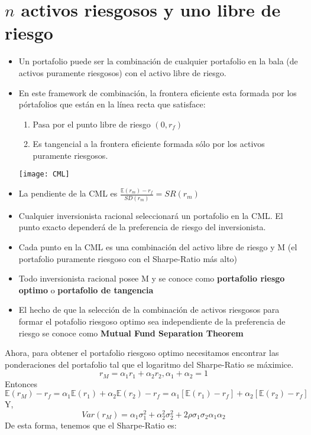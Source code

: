 \documentclass[12pts]{extarticle}
\begin{document}
\section{$n$ activos riesgosos y uno libre de riesgo} 
\begin{itemize}
\item Un portafolio puede ser la combinación de cualquier portafolio en la bala (de activos puramente riesgosos) con el activo libre de riesgo.
\item En este framework de combinación, la frontera eficiente esta formada por los pórtafolios que están en la línea recta que satisface:  
\begin{enumerate}
\item Pasa por el punto libre de riesgo $(0,r_f)$
\item Es tangencial a la frontera eficiente formada sólo por los activos puramente riesgosos. 
\end{enumerate}
\begin{center}
\texttt{[image: CML]}
\end{center}
\item La pendiente de la CML es $\frac{\mathbb{E}(r_m) - r_f}{SD(r_m)} = SR(r_m)$
\item Cualquier inversionista racional seleccionará un portafolio en la CML. El punto exacto dependerá de la preferencia de riesgo del inversionista. 
\item Cada punto en la CML es una combinación del activo libre de riesgo y M (el portafolio puramente riesgoso con el Sharpe-Ratio más alto)
\item Todo inversionista racional posee M y se conoce como \textbf{portafolio riesgo optimo} o \textbf{portafolio de tangencia}
\item El hecho de que la selección de la combinación de activos riesgosos para formar el potafolio riesgoso optimo sea independiente de la preferencia de riesgo se conoce como \textbf{Mutual Fund Separation Theorem} 
\end{itemize}
Ahora, para obtener el portafolio riesgoso optimo necesitamos encontrar las ponderaciones del portafolio tal que el logaritmo del Sharpe-Ratio se máximice. 
$$ r_M =\alpha_1 r_1 + \alpha_2 r_2,  \alpha_1 + \alpha_2=1$$ 
Entonces $$\mathbb{E}(r_M) - r_f = \alpha_1 \mathbb{E}(r_1) + \alpha_2 \mathbb{E}(r_2) -r_f = \alpha_1 [\mathbb{E}(r_1) -r_f] +\alpha_2[\mathbb{E}(r_2)-r_f]$$
Y, $$Var(r_M)=\alpha_1 \sigma_1^2 + \alpha_2^2 \sigma_2^2 + 2\rho\sigma_1\sigma_2\alpha_1\alpha_2$$
De esta forma, tenemos que el Sharpe-Ratio es: 
\end{document}
